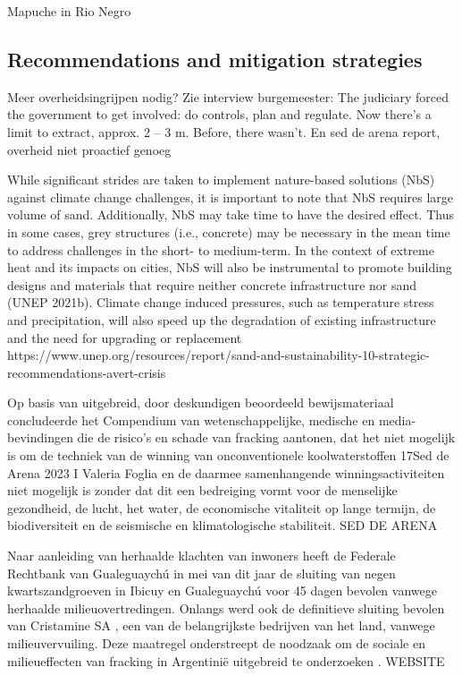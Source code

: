  Mapuche in Rio Negro

\subsection{Recommendations and mitigation strategies}
Meer overheidsingrijpen nodig? Zie interview burgemeester: The judiciary forced the government to get involved: do controls, plan and regulate. Now there’s
a limit to extract, approx. 2 – 3 m. Before, there wasn’t.
En sed de arena report, overheid niet proactief genoeg



While significant strides are taken to implement
nature-based solutions (NbS) against climate change
challenges, it is important to note that NbS requires large
volume of sand. Additionally, NbS may take time to have
the desired effect. Thus in some cases, grey structures
(i.e., concrete) may be necessary in the mean time to
address challenges in the short- to medium-term. In the
context of extreme heat and its impacts on cities, NbS
will also be instrumental to promote building designs and
materials that require neither concrete infrastructure nor
sand (UNEP 2021b). Climate change induced pressures,
such as temperature stress and precipitation, will also
speed up the degradation of existing infrastructure and
the need for upgrading or replacement
https://www.unep.org/resources/report/sand-and-sustainability-10-strategic-recommendations-avert-crisis

Op basis van uitgebreid, door deskundigen beoordeeld bewijsmateriaal concludeerde het Compendium van wetenschappelijke, medische en media-bevindingen die de risico's en schade van fracking aantonen, dat het niet mogelijk is om de techniek van de winning van onconventionele koolwaterstoffen 17Sed de Arena 2023 I Valeria Foglia en de daarmee samenhangende winningsactiviteiten niet mogelijk is zonder dat dit een bedreiging vormt voor de menselijke gezondheid, de lucht, het water, de economische vitaliteit op lange termijn, de biodiversiteit en de seismische en klimatologische stabiliteit. SED DE ARENA


Naar aanleiding van herhaalde klachten van inwoners heeft de Federale Rechtbank van Gualeguaychú in mei van dit jaar de sluiting van negen kwartszandgroeven in Ibicuy en Gualeguaychú voor 45 dagen bevolen vanwege herhaalde milieuovertredingen. Onlangs werd ook de definitieve sluiting bevolen van Cristamine SA , een van de belangrijkste bedrijven van het land, vanwege milieuvervuiling. Deze maatregel onderstreept de noodzaak om de sociale en milieueffecten van fracking in Argentinië uitgebreid te onderzoeken . WEBSITE